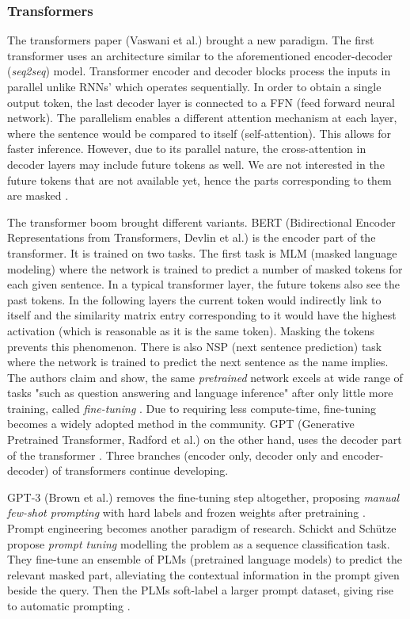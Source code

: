 \documentclass{article}
\begin{document}
\subsubsection{Transformers}
The transformers paper (Vaswani et al.) brought a new paradigm. The first transformer uses an architecture similar to the aforementioned encoder-decoder (\textit{seq2seq}) model. Transformer encoder and decoder blocks process the inputs in parallel unlike RNNs' which operates sequentially. In order to obtain a single output token, the last decoder layer is connected to a FFN (feed forward neural network). The parallelism enables a different attention mechanism at each layer, where the sentence would be compared to itself (self-attention). This allows for faster inference. However, due to its parallel nature, the cross-attention in decoder layers may include future tokens as well. We are not interested in the future tokens that are not available yet, hence the parts corresponding to them are masked \cite{vaswani_attention_2023}. 

The transformer boom brought different variants. BERT (Bidirectional Encoder Representations from Transformers, Devlin et al.) is the encoder part of the transformer. It is trained on two tasks. The first task is MLM (masked language modeling) where the network is trained to predict a number of masked tokens for each given sentence. In a typical transformer layer, the future tokens also see the past tokens. In the following layers the current token would indirectly link to itself and the similarity matrix entry corresponding to it would have the highest activation (which is reasonable as it is the same token). Masking the tokens prevents this phenomenon. There is also NSP (next sentence prediction) task where the network is trained to predict the next sentence as the name implies. The authors claim and show, the same \textit{pretrained} network excels at wide range of tasks "such as question answering and language inference" after only little more training, called \textit{fine-tuning} \cite{devlin_bert_2019}. Due to requiring less compute-time, fine-tuning becomes a widely adopted method in the community. GPT (Generative Pretrained Transformer, Radford et al.) on the other hand, uses the decoder part of the transformer \cite{radford_improving_2018}. Three branches (encoder only, decoder only and encoder-decoder) of transformers continue developing. 

GPT-3 (Brown et al.) removes the fine-tuning step altogether, proposing \textit{manual few-shot prompting} with hard labels and frozen weights after pretraining \cite{brown_language_2020}. Prompt engineering becomes another paradigm of research. Schickt and Schütze propose \textit{prompt tuning} modelling the problem as a sequence classification task. They fine-tune an ensemble of PLMs (pretrained language models) to predict the relevant masked part, alleviating the contextual information in the prompt given beside the query. Then the PLMs soft-label a larger prompt dataset, giving rise to automatic prompting \cite{schick_exploiting_2021}. 
\end{document}
